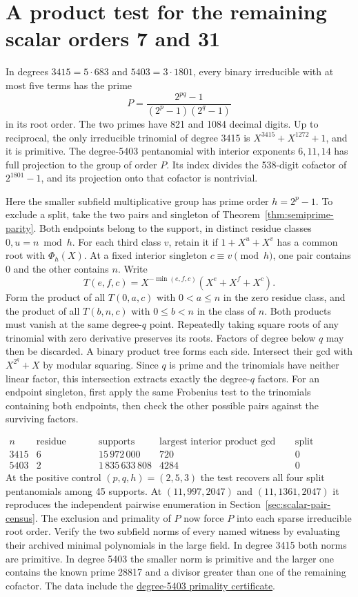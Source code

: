 \documentclass[11pt]{article}
\begin{document}
\clearpage
\section{A product test for the remaining scalar orders 7 and 31}
\label{sec:scalar-product-test}
In degrees \(3415=5\cdot683\) and \(5403=3\cdot1801\), every binary
irreducible with at most five terms has the prime
\[
             P=\frac{2^{pq}-1}{(2^p-1)(2^q-1)}
\]
in its root order. The two primes have 821 and 1084 decimal digits.
Up to reciprocal, the only irreducible trinomial of degree 3415 is
\(X^{3415}+X^{1272}+1\), and it is primitive. The degree-5403
pentanomial with interior exponents \(6,11,14\) has full projection
to the group of order \(P\). Its index divides the 538-digit
cofactor of \(2^{1801}-1\), and its projection onto that cofactor
is nontrivial.

Here the smaller subfield multiplicative group has prime order
\(h=2^p-1\). To exclude a split, take the two pairs and singleton
of Theorem~\ref{thm:semiprime-parity}. Both endpoints belong to the
support, in distinct residue classes \(0,u=n\bmod h\). For each third
class \(v\), retain it if \(1+X^u+X^v\) has a common root with
\(\Phi_h(X)\). At a fixed interior singleton \(c\equiv v\pmod h\),
one pair contains 0 and the other contains \(n\). Write
\[
 T(e,f,c)=X^{-\min(e,f,c)}(X^e+X^f+X^c).
\]
Form the product of all \(T(0,a,c)\) with \(0<a\le n\) in the
zero residue class, and the product of all \(T(b,n,c)\) with
\(0\le b<n\) in the class of \(n\). Both products must vanish at
the same degree-\(q\) point. Repeatedly taking square roots of any
trinomial with zero derivative preserves its roots. Factors of
degree below \(q\) may then be discarded. A binary product tree
forms each side. Intersect their gcd with \(X^{2^q}+X\) by modular
squaring. Since \(q\) is prime and the trinomials have neither
linear factor, this intersection extracts exactly the degree-\(q\)
factors. For an endpoint singleton, first apply the same Frobenius
test to the trinomials containing both endpoints, then check the
other possible pairs against the surviving factors.

\[
\begin{array}{r|r|r|r|r}
 n&\text{residue triples}&\text{supports}&
 \text{largest interior product gcd degree}&\text{split supports}\\\hline
3415&6&15\,972\,000&720&0\\
5403&2&1\,835\,633\,808&4284&0
\end{array}
\]
At the positive control \((p,q,h)=(2,5,3)\) the test recovers all
four split pentanomials among 45 supports. At \((11,997,2047)\)
and \((11,1361,2047)\) it reproduces the independent pairwise
enumeration in Section~\ref{sec:scalar-pair-census}.
The exclusion and primality of \(P\) now force \(P\) into each sparse
irreducible root order. Verify the two subfield norms of every named
witness by evaluating their archived minimal polynomials in the
large field. In degree 3415 both norms are primitive. In degree 5403
the smaller norm is primitive and the larger one contains the known
prime 28817 and a divisor greater than one of the remaining cofactor.
The data include the
\href{https://factordb.com/cert/1100000000000185517}{degree-5403
primality certificate}.
\end{document}

